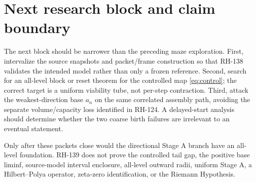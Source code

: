 \documentclass[12pt]{article}
\begin{document}
\section{Next research block and claim boundary}
The next block should be narrower than the preceding maze exploration.
First, intervalize the source snapshots and packet/frame construction so that
RH-138 validates the intended model rather than only a frozen reference.
Second, search for an all-level block or reset theorem for the controlled map
\eqref{eq:control}; the correct target is a uniform viability tube, not
per-step contraction.  Third, attack the weakest-direction base $a_n$ on the
same correlated assembly path, avoiding the separate volume/capacity loss
identified in RH-124.  A delayed-start analysis should determine whether the
two coarse birth failures are irrelevant to an eventual statement.

Only after these packets close would the directional Stage A branch have an
all-level foundation.  RH-139 does not prove the controlled tail gap, the
positive base liminf, source-model interval enclosure, all-level outward
radii, uniform Stage A, a Hilbert--Polya operator, zeta-zero identification,
or the Riemann Hypothesis.



\end{document}
